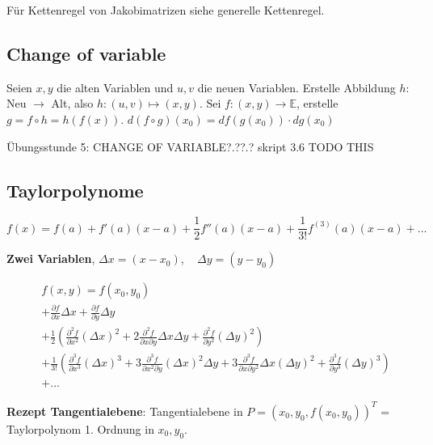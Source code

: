 Für Kettenregel von Jakobimatrizen siehe generelle Kettenregel.

\subsection{Change of variable}

Seien $x, y$ die alten Variablen und $u, v$ die neuen Variablen. Erstelle Abbildung $h:$ Neu $\to$ Alt, also $h: (u, v) \mapsto (x, y)$. Sei $f: (x, y) \to \mathbb{E}$, erstelle $g = f \circ h = h(f(x))$. $d (f \circ g) (x_0) = df(g(x_0)) \cdot dg(x_0)$

Übungsstunde 5: CHANGE OF VARIABLE?.??.? skript 3.6 TODO THIS


\subsection{Taylorpolynome}

\[
    f(x) = f(a) + f'(a)(x-a) + \frac{1}{2} f''(a)(x-a) + \frac{1}{3!} f^{(3)}(a)(x-a) + ...
\]

\textbf{Zwei Variablen}, $\Delta x = (x - x_0)$, ~ $\Delta y = (y - y_0)$

\begin{tiny}
\begin{align*}
    \; & f(x, y) =f(x_0, y_0)\\ &+ \frac{\partial f}{\partial x} \Delta x + \frac{\partial f}{\partial y} \Delta y\\
    &+ \frac{1}{2} \left(\frac{\partial^2 f}{\partial x^2} (\Delta x)^2 + 2\frac{\partial^2 f}{\partial x \partial y} \Delta x \Delta y + \frac{\partial^2 f}{\partial y^2} (\Delta y)^2\right)\\
    &+ \frac{1}{3!} \left(\frac{\partial^3 f}{\partial x^3} (\Delta x)^3 + 3\frac{\partial^3 f}{\partial x^2 \partial y} (\Delta x)^2 \Delta y + 3\frac{\partial^3 f}{\partial x \partial y^2} \Delta x (\Delta y)^2 + \frac{\partial^3 f}{\partial y^3} (\Delta y)^3\right)\\
    & + ...
\end{align*}
\end{tiny}

\textbf{Rezept Tangentialebene}: Tangentialebene in $P=(x_0, y_0, f(x_0, y_0))^T$ = Taylorpolynom 1. Ordnung in $x_0, y_0$.